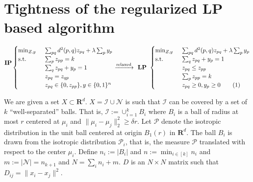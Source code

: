 \documentclass[12pt]{article}
\newcommand{\mc}{\mathcal}
\newcommand{\mb}{\mathbf}
\newcommand\numberthis{\addtocounter{equation}{1}\tag{\theequation}}
\begin{document}
\section{Tightness of the regularized LP based algorithm}
\begin{equation*}
  \begin{split}
	\textbf{IP}\\
	\textbf{}
  \end{split}
  \begin{cases}
		\min_{Z, y} \enspace &\sum_{pq}d^2(p, q)z_{pq} + \lambda \sum_p y_p\\
		\text{s.t. } \enspace &\sum_{p}z_{pp}= k\\
		& \sum_{q}z_{pq} + y_p = 1\\	
		&z_{pq} = z_{qp} \\
		& z_{pq} \in \{0, z_{pp}\}, y \in \{0, 1\}^n
	\end{cases}
	\xrightarrow{\text{relaxed}} \textbf{ LP } 
	\begin{cases}
		\min_{Z, y} \enspace &\sum_{pq}d^2(p, q)z_{pq} + \lambda \sum_p y_p\\
        \text{s.t. } &\sum_{q}z_{pq} + y_p = 1\\
		& z_{pq} \le z_{pp}\\
		& \sum_{p} z_{pp} = k\\		
		& z_{pq} \ge 0, y_p \ge 0 \numberthis\label{a-eqn:regularizedLP}
	\end{cases}
\end{equation*}

We are given a set $X \subset \mb R^d$. $X = \mc I \cup \mc N$ is such that $\mc I$ can be covered by a set of $k$ ``well-separated'' balls. That is, $\mc I := \cup_{i=1}^k B_i$ where $B_i$ is a ball of radius at most $r$ centered at $\mu_i$ and $\|\mu_i - \mu_j\|_{2}^{2} \ge \delta r$. Let $\mc P$ denote the isotropic distribution in the unit ball centered at origin $B_1(r)$ in $\mb R^d$. The ball $B_i$ is drawn from the isotropic distribution $\mc P_i$, that is, the measure $\mc P$ translated with respect to the center $\mu_i$. Define $n_i := |B_i|$ and $n := \min_{i\in[k]} n_i$ and $m := |\mc N| = n_{k+1}$ and $N = \sum_i n_i + m$. $D$ is an $N\times N$ matrix such that $D_{ij} = \|x_i -x_j\|^2$.
\end{document}
